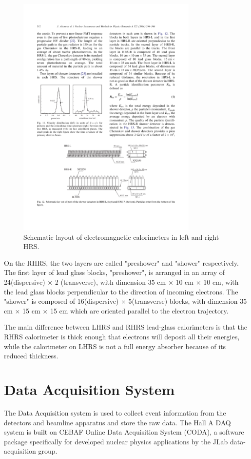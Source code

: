 \begin{figure}[tb!]
\centering
\includegraphics[width=0.8\textwidth]{figs/calorimeters.pdf}
\caption[Layout of electromagnetic calorimeters]{Schematic layout of electromagnetic calorimeters in left and right HRS.  \label{fig:calorimeters}}
\end{figure}

On the RHRS, the two layers are called "preshower" and "shower" respectively.
The first layer of lead glass blocks, "preshower", is arranged in an array of 24(dispersive) $\times$ 2 (transverse),
with dimension 35 cm $\times$ 10 cm $\times$ 10 cm, with the lead glass blocks perpendicular to the direction of
incoming electrons.
The "shower" is composed of 16(dispersive) $\times$ 5(transverse) blocks, with dimension 35 cm $\times$ 15 cm $\times$ 15 cm
which are oriented parallel to the electron trajectory.

The main difference between LHRS and RHRS lead-glass calorimeters is that the RHRS calorimeter is thick enough that 
electrons will deposit all their energies, while the calorimeter on LHRS is not a full energy absorber because of its
reduced thickness.


\section{Data Acquisition System}
The Data Acquisition system is used to collect event information from the detectors and beamline apparatus
and store the raw data.
The Hall A DAQ system is built on CEBAF Online Data Acquisition System (CODA), a software package specifically for
developed nuclear physics applications by the JLab data-acquisition group.  

